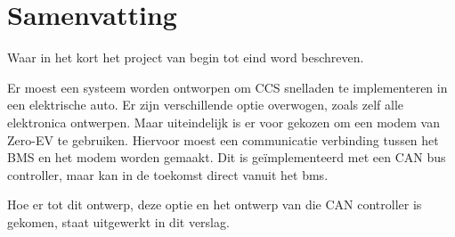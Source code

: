\chapter{Samenvatting}
\label{Samenvatting}

\begin{center}
    \begin{minipage}{0.5\textwidth}
        \begin{small}
            Waar in het kort het project van begin tot eind word beschreven.
        \end{small}
    \end{minipage}
    \vspace{0.5cm}
\end{center}

Er moest een systeem worden ontworpen om CCS snelladen te implementeren in een
elektrische auto. Er zijn verschillende optie overwogen, zoals zelf alle
elektronica ontwerpen. Maar uiteindelijk is er voor gekozen om een modem van
Zero-EV te gebruiken. Hiervoor moest een communicatie verbinding tussen het BMS
en het modem worden gemaakt. Dit is geïmplementeerd met een CAN bus
controller, maar kan in de toekomst direct vanuit het bms.

Hoe er tot dit ontwerp, deze optie en het ontwerp van die CAN controller is
gekomen, staat uitgewerkt in dit verslag.






